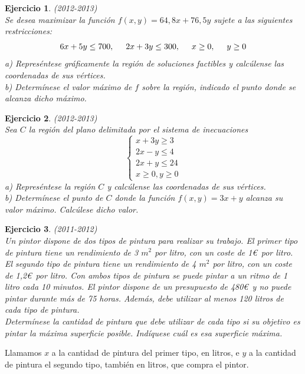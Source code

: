 \documentclass[12pt, a4paper]{amsart}
\newtheorem{ejer}{Ejercicio}
\newcommand{\s}{\color[rgb]{0,0,0.5}}
\newcommand{\n}{\color[rgb]{0,0,0}}
\begin{document}
\n

\begin{ejer}\em (2012-2013)\\
Se desea maximizar la función $f(x,y)=64,8x+76,5y$ sujete a las siguientes restricciones:
\[6x+5y\leq 700,\hspace*{0.5cm} 2x+3y\leq 300,\hspace*{0.5cm} x\geq 0,\hspace*{0.5cm} y\geq 0\]
a) Represéntese gráficamente la región de soluciones factibles y calcúlense las coordenadas de sus vértices.\\
b) Determínese el valor máximo de $f$ sobre la región, indicado el punto donde se alcanza dicho máximo.
\end{ejer}
\s

\n

\begin{ejer}\em (2012-2013)\\
Sea $C$ la región del plano delimitada por el sistema de inecuaciones
\begin{equation*}
\left \{ \begin{matrix} x+3y\geq 3
\\ 2x-y\leq 4
\\ 2x+y\leq 24
\\ x\geq 0, y\geq 0 \end{matrix}\right. 
\end{equation*}
a) Represéntese la región $C$ y calcúlense las coordenadas de sus vértices.\\
b) Determínese el punto de $C$ donde la función $f(x,y)=3x+y$ alcanza su valor máximo. Calcúlese dicho valor.
\end{ejer}
\s

\n


\begin{ejer}\em (2011-2012)\\
Un pintor dispone de dos tipos de pintura para realizar su trabajo. El primer tipo de pintura tiene un rendimiento de 3 $m^2$ por litro, con un coste de 1\euro\ por litro. 
El segundo tipo de pintura tiene un rendimiento de 4 $m^2$ por litro, con un coste de 1,2\euro\ por litro. Con ambos tipos de pintura se puede pintar a un ritmo de 1 litro cada 10 minutos. El pintor dispone de un presupuesto de 480\euro\ y no puede pintar durante más de 75 horas. Además, debe utilizar al menos 120 litros de cada tipo de pintura.\\
Determínese la cantidad de pintura que debe utilizar de cada tipo si su objetivo es pintar la máxima superficie posible. Indíquese cuál es esa superficie máxima.
\end{ejer}
\s
Llamamos $x$ a la cantidad de pintura del primer tipo, en litros, e $y$ a la cantidad de pintura el segundo tipo, también en litros, que compra el pintor.
\end{document}
